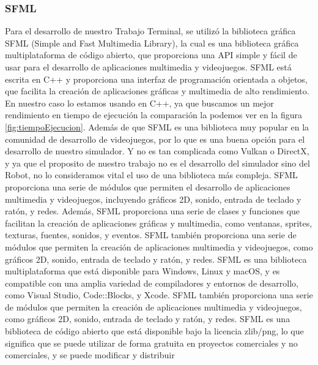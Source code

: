 \subsubsection{SFML}
    Para el desarrollo de nuestro Trabajo Terminal, se utiliz\'o la biblioteca gr\'afica SFML (Simple and Fast Multimedia Library), 
        la cual es una biblioteca gr\'afica multiplataforma de c\'odigo abierto, que proporciona una API simple y f\'acil de usar 
        para el desarrollo de aplicaciones multimedia y videojuegos. SFML est\'a escrita en C++ y proporciona una interfaz de 
        programaci\'on orientada a objetos, que facilita la creaci\'on de aplicaciones gr\'aficas y multimedia de alto rendimiento.
    \vskip 0.5cm
    En nuestro caso lo estamos usando en C++, ya que buscamos un mejor rendimiento en tiempo de ejecuci\'on la comparaci\'on la podemos ver
        en la figura \ref{fig:tiempoEjecucion}. Adem\'as de que SFML es una biblioteca muy popular en la comunidad de desarrollo de videojuegos, por lo que es una buena opci\'on 
        para el desarrollo de nuestro simulador. Y no es tan complicada como Vulkan o DirectX, y ya que el proposito de nuestro trabajo 
        no es el desarrollo del simulador sino del Robot, no lo consideramos vital el uso de una biblioteca m\'as compleja.
    \vskip 0.5cm
    SFML proporciona una serie de m\'odulos que permiten el desarrollo de aplicaciones multimedia y videojuegos, 
        incluyendo gr\'aficos 2D, sonido, entrada de teclado y rat\'on, y redes. Adem\'as, SFML proporciona una serie de 
        clases y funciones que facilitan la creaci\'on de aplicaciones gr\'aficas y multimedia, como ventanas, sprites, 
        texturas, fuentes, sonidos, y eventos. SFML tambi\'en proporciona una serie de m\'odulos que permiten la creaci\'on 
        de aplicaciones multimedia y videojuegos, como gr\'aficos 2D, sonido, entrada de teclado y rat\'on, y redes.
    \vskip 0.5cm
    SFML es una biblioteca multiplataforma que est\'a disponible para Windows, Linux y macOS, y es compatible con una 
        amplia variedad de compiladores y entornos de desarrollo, como Visual Studio, Code::Blocks, y Xcode. SFML tambi\'en 
        proporciona una serie de m\'odulos que permiten la creaci\'on de aplicaciones multimedia y videojuegos, como gr\'aficos 
        2D, sonido, entrada de teclado y rat\'on, y redes.
    \vskip 0.5cm
    SFML es una biblioteca de c\'odigo abierto que est\'a disponible bajo la licencia zlib/png, lo que significa que 
        se puede utilizar de forma gratuita en proyectos comerciales y no comerciales, y se puede modificar y distribuir 
